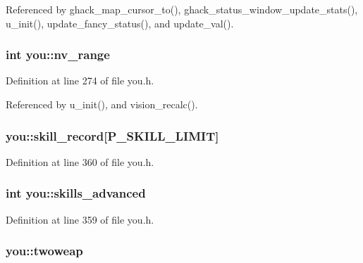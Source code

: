 Referenced by ghack\+\_\+map\+\_\+cursor\+\_\+to(), ghack\+\_\+status\+\_\+window\+\_\+update\+\_\+stats(), u\+\_\+init(), update\+\_\+fancy\+\_\+status(), and update\+\_\+val().

\hypertarget{structyou_ae113edf3224fab48b8169fb457f26166}{
\subsubsection[{nv\+\_\+range}]{\setlength{\rightskip}{0pt plus 5cm}int you\+::nv\+\_\+range}}\label{structyou_ae113edf3224fab48b8169fb457f26166}


Definition at line 274 of file you.\+h.



Referenced by u\+\_\+init(), and vision\+\_\+recalc().

\hypertarget{structyou_ae1a263e0ff3b5780cfec4a4270de467d}{
\subsubsection[{skill\+\_\+record}]{ you\+::skill\+\_\+record\mbox{[}{\bf P\+\_\+\+S\+K\+I\+L\+L\+\_\+\+L\+I\+M\+I\+T}\mbox{]}}}\label{structyou_ae1a263e0ff3b5780cfec4a4270de467d}


Definition at line 360 of file you.\+h.

\hypertarget{structyou_a13f09328a1c11c4a1bee0309d0ef84e6}{
\subsubsection[{skills\+\_\+advanced}]{\setlength{\rightskip}{0pt plus 5cm}int you\+::skills\+\_\+advanced}}\label{structyou_a13f09328a1c11c4a1bee0309d0ef84e6}


Definition at line 359 of file you.\+h.

\hypertarget{structyou_ade2cee6956bba775aa796bba6ae857ec}{
\subsubsection[{twoweap}]{ you\+::twoweap}}\label{structyou_ade2cee6956bba775aa796bba6ae857ec}


